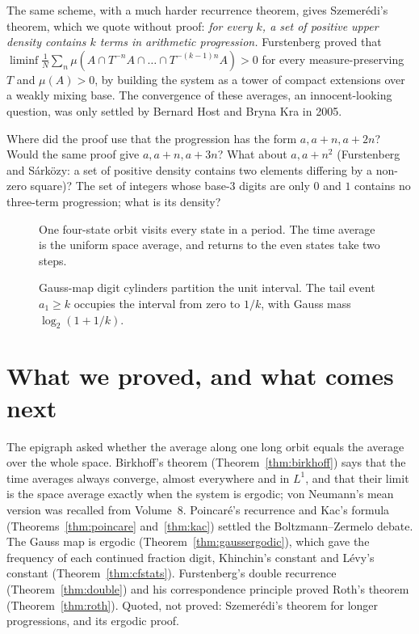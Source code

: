 The same scheme, with a much harder recurrence theorem, gives Szemer\'edi's theorem, which we quote without proof: \emph{for every $k$, a set of positive upper density contains $k$ terms in arithmetic progression.} Furstenberg proved that
$\liminf\frac1N\sum_n\mu(A\cap T^{-n}A\cap\dots\cap T^{-(k-1)n}A)>0$ for every measure-preserving $T$ and $\mu(A)>0$, by building the system as a tower of compact extensions over a weakly mixing base. The
convergence of these averages, an innocent-looking question, was only settled by Bernard Host and Bryna Kra in 2005.

\begin{think}
Where did the proof use that the progression has the form $a,a+n,a+2n$? Would the same proof give $a,a+n,a+3n$? What about $a,a+n^2$ (Furstenberg and S\'ark\"ozy: a set of positive density contains two elements differing by a non-zero
square)? The set of integers whose base-$3$ digits are only $0$ and $1$ contains no three-term progression; what is its density?
\end{think}

\begin{figure}[ht]
\centering
{}
\caption{One four-state orbit visits every state in a period. The time average is the uniform space average, and returns to the even states take two steps.}
\label{fig:v11-ch10-cycle}
\end{figure}

\begin{figure}[ht]
\centering
{}
\caption{Gauss-map digit cylinders partition the unit interval. The tail event $a_1\ge k$ occupies the interval from zero to $1/k$, with Gauss mass $\log_2(1+1/k)$.}
\label{fig:v11-ch10-gauss-tail}
\end{figure}

\section{What we proved, and what comes next}

The epigraph asked whether the average along one long orbit equals the average over the whole space. Birkhoff's theorem (Theorem~\ref{thm:birkhoff})
says that the time averages always converge, almost everywhere and in $L^1$, and that their limit is the space average exactly when the system is
ergodic; von Neumann's mean version was recalled from Volume~8. Poincar\'e's recurrence and Kac's formula (Theorems~\ref{thm:poincare}
and~\ref{thm:kac}) settled the Boltzmann--Zermelo debate. The Gauss map is ergodic (Theorem~\ref{thm:gaussergodic}), which gave the frequency of each
continued fraction digit, Khinchin's constant and L\'evy's constant (Theorem~\ref{thm:cfstats}). Furstenberg's double recurrence
(Theorem~\ref{thm:double}) and his correspondence principle proved Roth's theorem (Theorem~\ref{thm:roth}). Quoted, not proved: Szemer\'edi's theorem
for longer progressions, and its ergodic proof.

